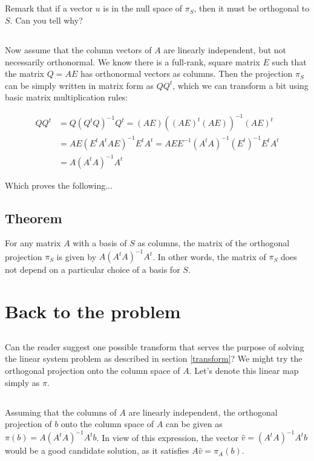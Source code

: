 \documentclass{proc-l}
\theoremstyle{definition}
\theoremstyle{remark}
\numberwithin{equation}{section}
\begin{document}
\subsection{}\label{null-remark}
Remark that if a vector $u$ is in the null space of $\pi_S$, then it must be orthogonal to $S$. Can you tell why?

\subsection{}
Now assume that the column vectors of $A$ are linearly independent, but not necessarily orthonormal. We know there is a full-rank, square matrix $E$ such that the matrix $Q=AE$ has orthonormal vectors as columns. Then the projection $\pi_S$ can be simply written in matrix form as $QQ^t$, which we can transform a bit using basic matrix multiplication rules:

\begin{align*}
QQ^t & = Q(Q^tQ)^{-1}Q^t = (AE)((AE)^t(AE))^{-1}(AE)^t\\ 
&= AE(E^tA^tAE)^{-1}E^tA^t = AEE^{-1}(A^t A)^{-1}(E^t)^{-1}E^tA^t\\ 
&= A(A^tA)^{-1}A^t
\end{align*}

\noindent Which proves the following...

\subsection{Theorem}
For any matrix $A$ with a basis of $S$ as columns, the matrix of the orthogonal projection $\pi_S$ is given by $A(A^tA)^{-1}A^t$. In other words, the matrix of $\pi_S$ does not depend on a particular choice of a basis for $S$. 


\section{Back to the problem}

\subsection{}
Can the reader suggest one possible transform that serves the purpose of solving the linear system problem as described in section \ref{transform}? We might try the orthogonal projection onto the column space of $A$. Let's denote this linear map simply as $\pi$.

\subsection{}
Assuming that the columns of $A$ are linearly independent, the orthogonal projection of $b$ onto the column space of $A$ can be given as $\pi(b) = A(A^tA)^{-1}A^tb$. In view of this expression, the vector $\hat v = (A^tA)^{-1}A^tb$ would be a good candidate solution, as it satisfies $A\hat v = \pi_A(b)$. 
\end{document}
